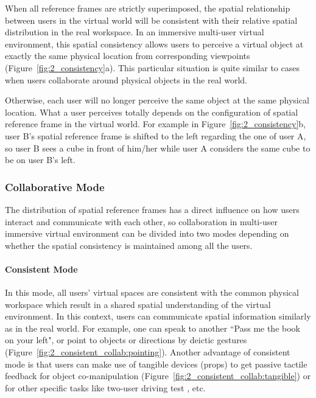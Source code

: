 When all reference frames are strictly superimposed, the spatial relationship between users in the virtual world will be consistent with their relative spatial distribution in the real workspace. In an immersive multi-user virtual environment, this spatial consistency allows users to perceive a virtual object at exactly the same physical location from corresponding viewpoints (Figure~\ref{fig:2_consistency}a). This particular situation is quite similar to cases when users collaborate around physical objects in the real world.

Otherwise, each user will no longer perceive the same object at the same physical location. What a user perceives totally depends on the configuration of spatial reference frame in the virtual world. For example in Figure~\ref{fig:2_consistency}b, user B's spatial reference frame is shifted to the left regarding the one of user A, so user B sees a cube in front of him/her while user A considers the same cube to be on user B's left.


\subsubsection{Collaborative Mode}
The distribution of spatial reference frames has a direct influence on how users interact and communicate with each other, so collaboration in multi-user immersive virtual environment can be divided into two modes depending on whether the spatial consistency is maintained among all the users.


\paragraph{Consistent Mode}
In this mode, all users' virtual spaces are consistent with the common physical workspace which result in a shared spatial understanding of the virtual environment. In this context, users can communicate spatial information similarly as in the real world. For example, one can speak to another ``Pass me the book on your left", or point to objects or directions by deictic gestures \citep{Salzmann2009VRPointing} (Figure~\ref{fig:2_consistent_collab:pointing}). Another advantage of consistent mode is that users can make use of tangible devices (props) to get passive tactile feedback for object co-manipulation \citep{Aguerreche2009Three, Salzmann2009CIC} (Figure~\ref{fig:2_consistent_collab:tangible}) or for other specific tasks like two-user driving test \citep{Salzmann2008TUS}, etc.

